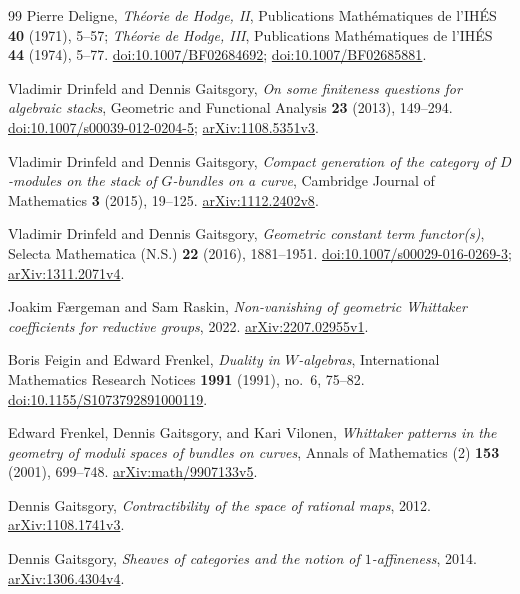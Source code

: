 \documentclass[11pt]{article}
\numberwithin{equation}{section}
\theoremstyle{definition}
\theoremstyle{remark}
\begin{document}
\begin{thebibliography}{99}
Pierre Deligne,
\emph{Th\'eorie de Hodge, II},
Publications Math\'ematiques de l'IH\'ES \textbf{40} (1971), 5--57;
\emph{Th\'eorie de Hodge, III},
Publications Math\'ematiques de l'IH\'ES \textbf{44} (1974), 5--77.
\href{https://doi.org/10.1007/BF02684692}{doi:10.1007/BF02684692};
\href{https://doi.org/10.1007/BF02685881}{doi:10.1007/BF02685881}.

Vladimir Drinfeld and Dennis Gaitsgory,
\emph{On some finiteness questions for algebraic stacks},
Geometric and Functional Analysis \textbf{23} (2013), 149--294.
\href{https://doi.org/10.1007/s00039-012-0204-5}{doi:10.1007/s00039-012-0204-5};
\href{https://arxiv.org/abs/1108.5351v3}{arXiv:1108.5351v3}.

Vladimir Drinfeld and Dennis Gaitsgory,
\emph{Compact generation of the category of $D$-modules on the stack of
$G$-bundles on a curve},
Cambridge Journal of Mathematics \textbf{3} (2015), 19--125.
\href{https://arxiv.org/abs/1112.2402v8}{arXiv:1112.2402v8}.

Vladimir Drinfeld and Dennis Gaitsgory,
\emph{Geometric constant term functor(s)},
Selecta Mathematica (N.S.) \textbf{22} (2016), 1881--1951.
\href{https://doi.org/10.1007/s00029-016-0269-3}{doi:10.1007/s00029-016-0269-3};
\href{https://arxiv.org/abs/1311.2071v4}{arXiv:1311.2071v4}.

Joakim F\ae rgeman and Sam Raskin,
\emph{Non-vanishing of geometric Whittaker coefficients for reductive groups},
2022.
\href{https://arxiv.org/abs/2207.02955v1}{arXiv:2207.02955v1}.

Boris Feigin and Edward Frenkel,
\emph{Duality in $W$-algebras},
International Mathematics Research Notices \textbf{1991} (1991), no.~6, 75--82.
\href{https://doi.org/10.1155/S1073792891000119}{doi:10.1155/S1073792891000119}.

Edward Frenkel, Dennis Gaitsgory, and Kari Vilonen,
\emph{Whittaker patterns in the geometry of moduli spaces of bundles on curves},
Annals of Mathematics (2) \textbf{153} (2001), 699--748.
\href{https://arxiv.org/abs/math/9907133v5}{arXiv:math/9907133v5}.

Dennis Gaitsgory,
\emph{Contractibility of the space of rational maps}, 2012.
\href{https://arxiv.org/abs/1108.1741v3}{arXiv:1108.1741v3}.

Dennis Gaitsgory,
\emph{Sheaves of categories and the notion of $1$-affineness}, 2014.
\href{https://arxiv.org/abs/1306.4304v4}{arXiv:1306.4304v4}.


\end{thebibliography}
\end{document}
